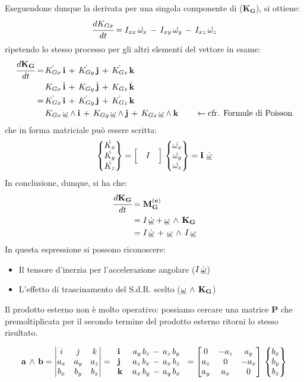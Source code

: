 Eseguendone dunque la derivata per una singola componente di ($\mathbf{K_G}$), si ottiene:
\[\cfrac{dK_{Gx}}{dt} = I_{xx}\,\dot{\omega_x}\,-\,I_{xy}\,\dot{\omega_y}\,-\,I_{xz}\,\dot{\omega_z}\]
	ripetendo lo stesso processo per gli altri elementi del vettore in esame:
	\begin{align*}
	\cfrac{d\mathbf{K_G}}{dt} = \,&\dot{K_{Gx}}\,\mathbf{i}\,+\,\dot{K_{Gy}}\,\mathbf{j}\,+\,\dot{K_{Gz}}\,\mathbf{k}\\
							  &K_{Gx}\,\dot{\mathbf{i}}\,+\,K_{Gy}\,\dot{\mathbf{j}}\,+\,K_{Gz}\,\dot{\mathbf{k}}\\
							  = \,&\dot{K_{Gx}}\,\mathbf{i}\,+\,\dot{K_{Gy}}\,\mathbf{j}\,+\,\dot{K_{Gz}}\,\mathbf{k}\\
							  & K_{Gx}\,\underline{\omega}\wedge\mathbf{i}\,+\,K_{Gy}\,\underline{\omega}\wedge\mathbf{j}\,+\,K_{Gz}\,\underline{\omega}\wedge\mathbf{k}\qquad\leftarrow \text{cfr. Formule di Poisson}
	\end{align*}
	che in forma matriciale può essere scritta:
	\[\begin{Bmatrix}\dot{K_x}\\\dot{K_y}\\\dot{K_z}\end{Bmatrix} = \Bigl[\quad I\quad \Bigr]\,\begin{Bmatrix}\dot{\omega_x}\\\dot{\omega_y}\\\dot{\omega_z}\end{Bmatrix} = \mathbf{\mathbf{I}}\,\,\dot{\underline{\omega}}\]
	In conclusione, dunque, si ha che:
	\begin{align*}
	\cfrac{d\mathbf{K_G}}{dt} &= \mathbf{M_G^{(e)}}\\
	&= I\,\dot{\underline{\omega}} + \underline{\omega}\,\wedge\,\mathbf{K_G}\\
	&= I\,\dot{\underline{\omega}}\,+\, \underline{\omega}\,\wedge\,I\,\underline{\omega}
	\end{align*}
	In questa espressione si possono riconoscere:
	\begin{itemize}
	\item Il tensore d'inerzia per l'accelerazione angolare ($I\,\dot{\underline{\omega}}$)
	\item L'effetto di trascinamento del S.d.R. scelto ($\underline{\omega}\,\wedge\,\mathbf{K_G}$) 
	\end{itemize}
	
	Il prodotto esterno non è molto operativo: possiamo cercare una matrice \textbf{P} che premoltiplicata per il secondo termine del prodotto esterno ritorni lo stesso risultato.
	
	\[
		\mathbf{a}\,\wedge\,\mathbf{b} = \begin{vmatrix}i&j&k\\a_x&a_y&a_z\\b_x&b_y&b_z\end{vmatrix} = \begin{tabular}{lc}$\mathbf{i}$&$a_y\,b_z\,-\,a_z\,b_y$\\$\mathbf{j}$&$a_z\,b_x\,-\,a_x\,b_z$\\$\mathbf{k}$&$a_x\,b_y\,-\,a_y\,b_x$\end{tabular} = \M{0 & -a_z & a_y\\a_z&0&-a_x\\a_y&a_x&0}\,\B{b_x\\b_y\\b_z}
	\]

